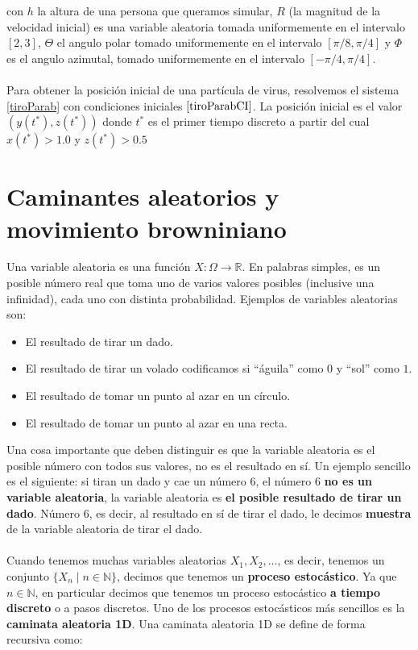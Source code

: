 \documentclass[11pt]{article}
\begin{document}
con $h$ la altura de una persona que queramos simular, $R$ (la magnitud de la velocidad inicial) es una variable aleatoria tomada uniformemente en el intervalo $[2,3]$, $\Theta$ el angulo polar tomado uniformemente en el intervalo $[\pi/8,\pi/4]$ y $\Phi$ es el angulo azimutal, tomado uniformemente en el intervalo  $[-\pi/4,\pi/4]$.
\\
\\Para obtener la posición inicial de una partícula de virus, resolvemos el sistema \ref{tiroParab} con condiciones iniciales $\ref{tiroParabCI}$. La posición inicial es el valor $(y(t^*),z(t^*))$ donde $t^*$ es el primer tiempo discreto a partir del cual $x(t^*) > 1.0$ y $z(t^*) > 0.5$
\section{Caminantes aleatorios y movimiento browniniano}
Una variable aleatoria es una función $X:\Omega \to \mathbb{R}$. En palabras simples, es un posible número real que toma uno de varios valores posibles (inclusive una infinidad), cada uno con distinta probabilidad. Ejemplos de variables aleatorias son:
\begin{itemize}
    \item El resultado de tirar un dado.
    \item El resultado de tirar un volado codificamos si ``águila'' como $0$ y ``sol'' como $1$.
    \item El resultado de tomar un punto al azar en un círculo.
    \item El resultado de tomar un punto al azar en una recta.
\end{itemize}
Una cosa importante que deben distinguir es que la variable aleatoria es el posible número con todos sus valores, no es el resultado en sí. Un ejemplo sencillo es el siguiente: si tiran un dado y cae un número 6, el número 6 \textbf{no es un variable aleatoria}, la variable aleatoria es \textbf{el posible resultado de tirar un dado}. Número 6, es decir, al resultado en sí de tirar el dado, le decimos \textbf{muestra} de la variable aleatoria de tirar el dado.
\\
\\Cuando tenemos muchas variables aleatorias $X_1,X_2,\ldots $, es decir, tenemos un conjunto $\{X_n \mid n \in \mathbb{N}\}$, decimos que tenemos un \textbf{proceso estocástico}. Ya que $n \in \mathbb{N}$, en particular decimos que tenemos un proceso estocástico \textbf{a tiempo discreto} o a pasos discretos. Uno de los procesos estocásticos más sencillos es la \textbf{caminata aleatoria 1D}. Una caminata aleatoria 1D se define de forma recursiva como:
\end{document}
